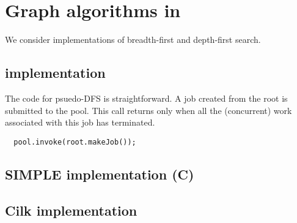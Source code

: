\section{Graph algorithms in \XWS}\label{sec:Graph}

We consider implementations of breadth-first and depth-first search.

\subsection{\XWS implementation}

The code for psuedo-DFS is straightforward. A job created from the root
is submitted to the pool. This call returns only when all the 
(concurrent) work associated with this job has terminated. 
{\footnotesize
\begin{verbatim}
  pool.invoke(root.makeJob());
\end{verbatim}
}


\subsection{SIMPLE implementation (C)}


\subsection{Cilk implementation}
